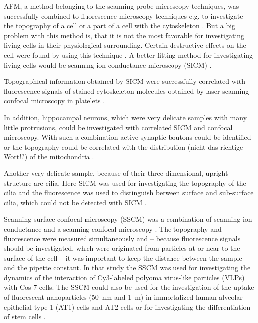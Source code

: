 AFM, a method belonging to the scanning probe microscopy techniques, was successfully
combined to fluorescence microscopy techniques e.g. to investigate the topography of a 
cell or a part of a cell with the cytoskeleton \cite{Laishram2009,Liu2020}. But a big problem 
with this method is, that it is not the most favorable for investigating living cells in their
physiological surrounding. Certain destructive effects on the cell were found by using this 
technique \cite{You2000,Rheinlaender2011}. A better fitting method for investigating living cells 
would be scanning ion conductance microscopy (SICM) \cite{Hansma1989}. 



Topographical information obtained by SICM were successfully correlated with fluorescence signals
of stained cytoskeleton molecules obtained by laser scanning confocal microscopy in platelets 
\cite{Seifert2017}. 

In addition, hippocampal neurons, which were very delicate samples with many little protrusions, 
could be investigated with correlated SICM and confocal microscopy. With such a combination active
synaptic boutons could be identified \cite{Novak2013} or the topography could be correlated with 
the distribution (nicht das richtige Wort!?) of the mitochondria \cite{Takahashi2019}. 

Another very delicate sample, because of their three-dimensional, upright structure are cilia.
Here SICM was used for investigating the topography of the cilia and the fluorescence was used to
distinguish between surface and sub-surface cilia, which could not be detected with SICM 
\cite{Zhou2018}.

Scanning surface confocal microscopy (SSCM) was a combination of scanning ion conductance and a 
scanning confocal microscopy \cite{Gorelik2002}. The topography and fluorescence were measured
simultaneously and -- because fluorescence signals should be investigated, which were originated
from particles at or near to the surface of the cell -- it was important to keep the distance 
between the sample and the pipette constant. In that study the SSCM was used for investigating the 
dynamics of the interaction of Cy3-labeled polyoma virus-like particles (VLPs) with Cos-7 cells. 
The SSCM could also be used for the investigation of the uptake of fluorescent nanoparticles 
(50~nm and 1~{\textmu}m) in immortalized human alveolar epithelial type 1 (AT1) cells and AT2 
cells \cite{Kemp2008} or for investigating the differentiation of stem cells \cite{Gorelik2008}.

